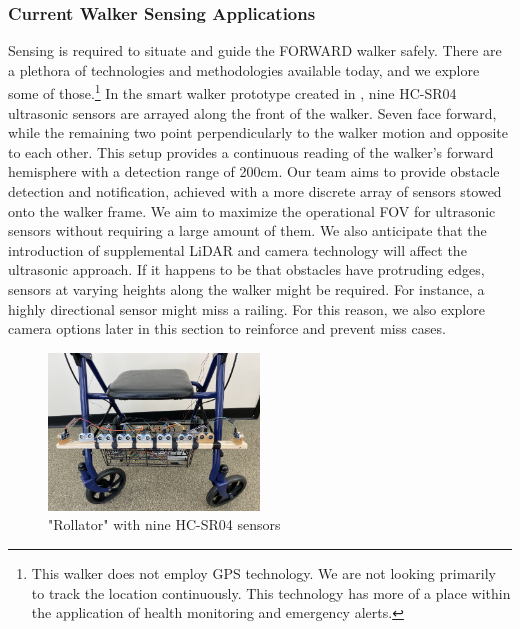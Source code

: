 \subsubsection{Current Walker Sensing Applications}
\noindent Sensing is required to situate and guide the FORWARD walker safely. There are a plethora of technologies and methodologies available today, and we explore some of those.\footnote{\noindent This walker does not employ GPS technology. We are not looking primarily to track the location continuously. This technology has more of a place within the application of health monitoring and emergency alerts.} In the smart walker prototype created in \cite{Mostofa}, nine HC-SR04 ultrasonic sensors are arrayed along the front of the walker. Seven face forward, while the remaining two point perpendicularly to the walker motion and opposite to each other. This setup provides a continuous reading of the walker's forward hemisphere with a detection range of 200cm. Our team aims to provide obstacle detection and notification, achieved with a more discrete array of sensors stowed onto the walker frame. We aim to maximize the operational FOV for ultrasonic sensors without requiring a large amount of them. We also anticipate that the introduction of supplemental LiDAR and camera technology will affect the ultrasonic approach. If it happens to be that obstacles have protruding edges, sensors at varying heights along the walker might be required. For instance, a highly directional sensor might miss a railing. For this reason, we also explore camera options later in this section to reinforce and prevent miss cases.\\

\begin{figure}[H]
	\centering
	\includegraphics[width=0.5\textwidth]{./Images/mostafa9.png}
	\caption{\label{fig:mostafa9}"Rollator" with nine HC-SR04 sensors \cite{Mostofa}}
\end{figure}

